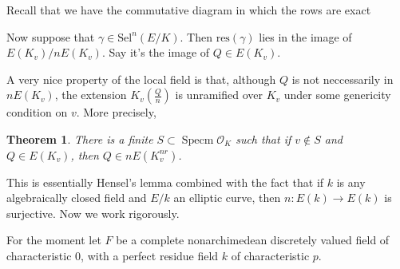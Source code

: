 \documentclass{article}
\newtheorem{thm}{Theorem}
\newtheorem{prop}[thm]{Proposition}
\newcommand{\ord}{\mathcal{O}}
\DeclareMathOperator{\spec}{Specm}
\begin{document}
Recall that we have the commutative diagram in which the rows are exact
\begin{figure}[H]
\centering
{}

\end{figure}

Now suppose that $ \gamma\in \mathrm{Sel}^{n}(E/K) $.
Then $ \mathrm{res}(\gamma) $ lies in the image of $ E (K _{v})/n E (K _{v}) $.
Say it's the image of $ Q\in E (K _{v}) $.

A very nice property of the local field is that,
although $ Q $ is not neccessarily in $ n E (K _{v}) $,
the extension $ K _{v}\left(\frac{Q}{n}\right) $ is unramified over $ K _{v} $
under some genericity condition on $ v $.
More precisely,

\begin{thm}
There is a finite $ S\subset \spec \ord _{K} $ such that
if $ v\not\in S $ and $ Q\in E (K _{v}) $,
then $ Q\in n E (K _{v}^{nr}) $.
\end{thm}

This is essentially Hensel's lemma combined with the fact that
if $ k $ is any algebraically closed field and
$ E/k $ an elliptic curve,
then $ n: E (k)\to E (k) $ is surjective.
Now we work rigorously.

For the moment let $ F $ be a 
complete nonarchimedean discretely valued field of characteristic $ 0 $,
with a perfect residue field $ k $ of characteristic $ p $.
\end{document}
